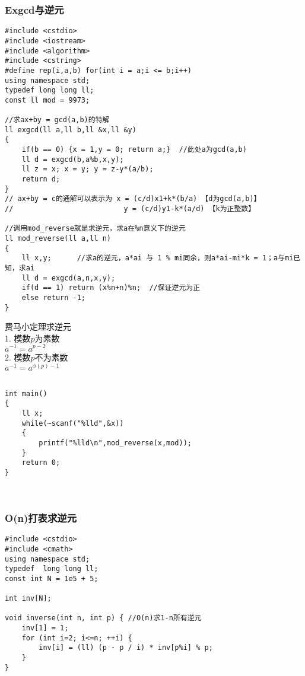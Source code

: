 \documentclass[twoside]{article}
\begin{document}
\subsubsection{Exgcd与逆元}
\begin{lstlisting}
#include <cstdio>
#include <iostream>
#include <algorithm>
#include <cstring>
#define rep(i,a,b) for(int i = a;i <= b;i++)
using namespace std;
typedef long long ll;
const ll mod = 9973; 

//求ax+by = gcd(a,b)的特解
ll exgcd(ll a,ll b,ll &x,ll &y)
{
	if(b == 0) {x = 1,y = 0; return a;}  //此处a为gcd(a,b)
	ll d = exgcd(b,a%b,x,y);
	ll z = x; x = y; y = z-y*(a/b);
	return d;
}
// ax+by = c的通解可以表示为 x = (c/d)x1+k*(b/a) 【d为gcd(a,b)】
//						    y = (c/d)y1-k*(a/d)	【k为正整数】

//调用mod_reverse就是求逆元，求a在%n意义下的逆元
ll mod_reverse(ll a,ll n)   
{
	ll x,y;      //求a的逆元，a*ai 与 1 % mi同余，则a*ai-mi*k = 1；a与mi已知，求ai
	ll d = exgcd(a,n,x,y);
	if(d == 1) return (x%n+n)%n;  //保证逆元为正
	else return -1;
}

\end{lstlisting}
费马小定理求逆元\\
1. 模数$p$为素数\\
	$a^{-1}=a^{p-2}$ \\
2. 模数$p$不为素数\\
	$a^{-1}=a^{\phi(p)-1}$\\
\begin{lstlisting}

int main()
{
	ll x;
	while(~scanf("%lld",&x))
	{
		printf("%lld\n",mod_reverse(x,mod));
	}
	return 0;
}



\end{lstlisting}
\subsubsection{O(n)打表求逆元}
\begin{lstlisting}
#include <cstdio>
#include <cmath>
using namespace std;
typedef  long long ll;
const int N = 1e5 + 5;

int inv[N];
 
void inverse(int n, int p) { //O(n)求1-n所有逆元
    inv[1] = 1;
    for (int i=2; i<=n; ++i) {
        inv[i] = (ll) (p - p / i) * inv[p%i] % p;
    }
}\end{lstlisting}
\end{document}
